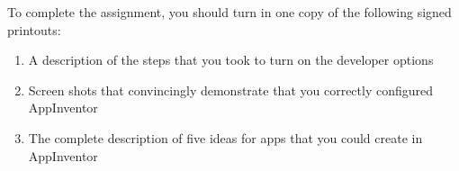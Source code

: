 
\noindent
To complete the assignment, you should turn in one copy of the following signed printouts: 
\vspace*{-.1in}

\begin{enumerate}
	\itemsep0em
	\item A description of the steps that you took to turn on the developer options
	\item Screen shots that convincingly demonstrate that you correctly configured AppInventor
	\item The complete description of five ideas for apps that you could create in AppInventor
\end{enumerate}

% 
% 		
% 
% 
% 
% 
% 

